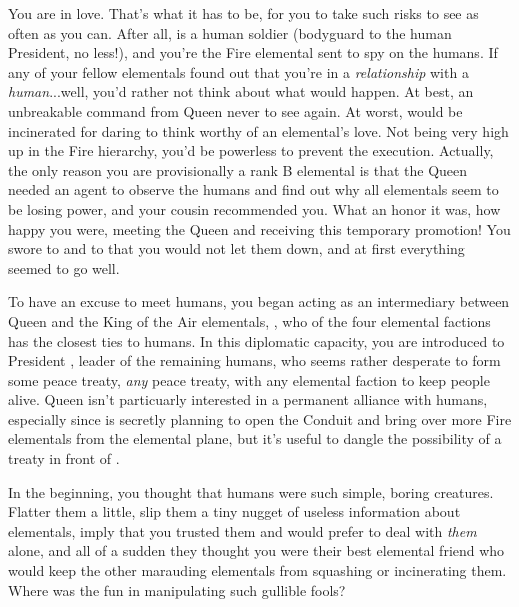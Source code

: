 \documentclass[char]{elementals}
\begin{document}
\name{\cJuliet{}}

You are in love.  That's what it has to be, for you to take such risks to see \cRomeo{\intro} as often as you can.  After all, \cRomeo{\they} is a human soldier (bodyguard to the human President, no less!), and you're the Fire elemental sent to spy on the humans.  If any of your fellow elementals found out that you're in a \emph{relationship} with a \emph{human}...well, you'd rather not think about what would happen.  At best, an unbreakable command from Queen \cQueen{\intro} never to see \cRomeo{} again.  At worst, \cRomeo{\they} would be incinerated for daring to think \cRomeo{\themself} worthy of an elemental's love.  Not being very high up in the Fire hierarchy, you'd be powerless to prevent the execution.  Actually, the only reason you are provisionally a rank B elemental is that the Queen needed an agent to observe the humans and find out why all elementals seem to be losing power, and your cousin \cPyro{\intro} recommended you.  What an honor it was, how happy you were, meeting the Queen and receiving this temporary promotion!  You swore to \cQueen{\them} and to \cPyro{} that you would not let them down, and at first everything seemed to go well.

To have an excuse to meet humans, you began acting as an intermediary between Queen \cQueen{} and the King of the Air elementals, \cKing{\intro}, who of the four elemental factions has the closest ties to humans.  In this diplomatic capacity, you are introduced to President \cLeader{\intro}, leader of the remaining humans, who seems rather desperate to form some peace treaty, \emph{any} peace treaty, with any elemental faction to keep \cLeader{\their} people alive.  Queen \cQueen{} isn't particuarly interested in a permanent alliance with humans, especially since \cQueen{\they} is secretly planning to open the Conduit and bring over more Fire elementals from the elemental plane, but it's useful to dangle the possibility of a treaty in front of \cLeader{\them}.  

In the beginning, you thought that humans were such simple, boring creatures.  Flatter them a little, slip them a tiny nugget of useless information about elementals, imply that you trusted them and would prefer to deal with \emph{them} alone, and all of a sudden they thought you were their best elemental friend who would keep the other marauding elementals from squashing or incinerating them.  Where was the fun in manipulating such gullible fools?
\end{document}
